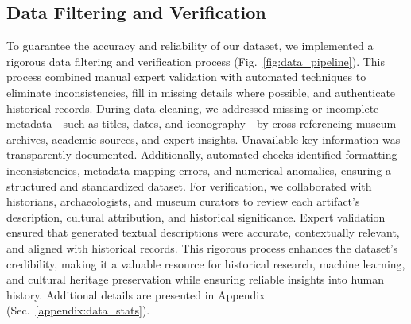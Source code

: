 \documentclass[11pt]{article}
\begin{document}
\subsection{Data Filtering and Verification}
To guarantee the accuracy and reliability of our dataset, we implemented a rigorous data filtering and verification process (Fig.~\ref{fig:data_pipeline}). This process combined manual expert validation with automated techniques to eliminate inconsistencies, fill in missing details where possible, and authenticate historical records. During data cleaning, we addressed missing or incomplete metadata—such as titles, dates, and iconography—by cross-referencing museum archives, academic sources, and expert insights. Unavailable key information was transparently documented. Additionally, automated checks identified formatting inconsistencies, metadata mapping errors, and numerical anomalies, ensuring a structured and standardized dataset.
For verification, we collaborated with historians, archaeologists, and museum curators to review each artifact’s description, cultural attribution, and historical significance. Expert validation ensured that generated textual descriptions were accurate, contextually relevant, and aligned with historical records. This rigorous process enhances the dataset’s credibility, making it a valuable resource for historical research, machine learning, and cultural heritage preservation while ensuring reliable insights into human history. Additional details are presented in Appendix (Sec.~\ref{appendix:data_stats}).
\end{document}
